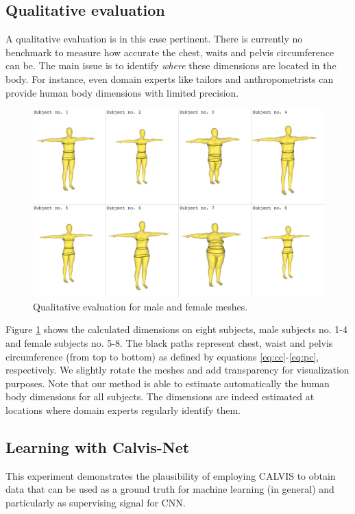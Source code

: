 \documentclass[runningheads, orivec]{llncs}
\begin{document}
\subsection{Qualitative evaluation}\label{subsec:qualitative_eval}
A qualitative evaluation is in this case pertinent. There is currently no benchmark to measure how accurate the chest, waits and pelvis circumference can be. The main issue is to identify \textit{where} these dimensions are located in the body. For instance, even domain experts like tailors and anthropometrists can provide human body dimensions with limited precision.
\begin{figure}[H]
	\begin{center}
		\includegraphics[width=\linewidth]{experiment_1_results.png}
	\end{center}
	\caption{Qualitative evaluation for male and female meshes.}
	\label{fig:qualitative_eval}
\end{figure}

Figure \ref{fig:qualitative_eval} shows the calculated dimensions on eight 
subjects, male subjects no. 1-4 and female subjects no. 5-8. The black paths 
represent chest, waist and pelvis circumference (from 
top to bottom) as defined by equations \ref{eq:cc}-\ref{eq:pc}, respectively. 
We slightly rotate the meshes and add transparency for visualization purposes. 
Note that our method is able to estimate automatically the human body 
dimensions for all 
subjects. The dimensions are indeed estimated at locations where domain experts regularly identify them.

\subsection{Learning with Calvis-Net}\label{subsec:learning}
This experiment demonstrates the plausibility of employing CALVIS to obtain 
data 
that can be used as a ground truth for machine learning (in general) and particularly as supervising signal for CNN.
\end{document}

